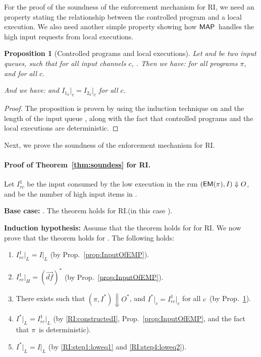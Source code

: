 \documentclass[10pt,a4paper,oneside]{article}
\newtheorem{proposition}{Proposition}[section]
\def\execution#1#2#3{\ensuremath{(#1, #2)\Downarrow#3}}
\def\defseq#1{\ensuremath{#1 = (\defvec)^*}}
\def\loweq#1#2{\ensuremath{\restrict{#1}{L} = \restrict{#2}{L}}}
\def\Irc#1{\ensuremath{I_{rc}^{#1}}}
\def\channeleq#1#2#3{\ensuremath{\restrict{#1}{#3} = \restrict{#2}{#3}}}
\def\restrict#1#2{\ensuremath{{#1}|_{#2}}}
\def\chnl{\ensuremath{c}}
\def\sanserif#1{\ensuremath{\sf #1}}
\def\MAP{\ensuremath{\sanserif{MAP}}}
\def\defvec{\ensuremath{\vec{df}}}
\def\EM{\ensuremath{{\sanserif{EM}}}}
\def\Prog{\ensuremath{\pi}}
\def\EMP{\ensuremath{\EM(}\ensuremath{\Prog)}}
\begin{document}
For the proof of the soundness of the enforcement mechanism for RI, we need an  property stating the relationship between the controlled program and a local execution. We also need another simple property showing how \MAP\ handles the high input requests from local executions.

\begin{proposition}[Controlled programs and local executions] \label{prop:semantics-eq} Let  and  be two input queues, such that for all input channels \chnl, . Then we have: for all programs \Prog,
 and  for all \chnl.

And we have:
 and \channeleq{I_{1_k}}{I_{2_k}}{\chnl} for all \chnl.
\end{proposition}

\begin{proof}
The proposition is proven by using the induction technique on  and the length of the input queue , along with the fact that controlled programs and the local executions are deterministic.
\end{proof}





Next, we prove the soundness of the enforcement mechanism for RI.
\paragraph{Proof of Theorem~\ref{thm:soundess} for RI.}
Let \Irc{1} be the input consumed by the low execution in the run \execution{\EMP}{I}{O}, and  be the number of high input items in .

\textbf{Base case:} . The theorem holds for RI.(in this case ).

\textbf{Induction hypothesis:} Assume that the theorem holds for  for RI. We now prove that the theorem holds for . The following holds:

\begin{enumerate}
\item \loweq{\Irc{1}}{I} (by Prop.~\ref{prop:InputOfEMP}). \label{RI:step1:loweq1}

\item \defseq{\Irc{1}|_H} (by Prop.~\ref{prop:InputOfEMP}). \label{RI:step2:HI}

\item There exists  such that \execution{\Prog}{I^*}{O^*}, and  \channeleq{I^*}{\Irc{1}}{\chnl} for all \chnl\ (by Prop.~\ref{prop:semantics-eq}). \label{RI:constructedI}
\item \loweq{I^*}{\Irc{1}} (by \ref{RI:constructedI}, Prop.~\ref{prop:InputOfEMP}, and  the fact that \Prog\ is deterministic). \label{RI:step4:loweq2}
\item \loweq{I^*}{I} (by \ref{RI:step1:loweq1} and \ref{RI:step4:loweq2}).
\end{enumerate}
\end{document}
